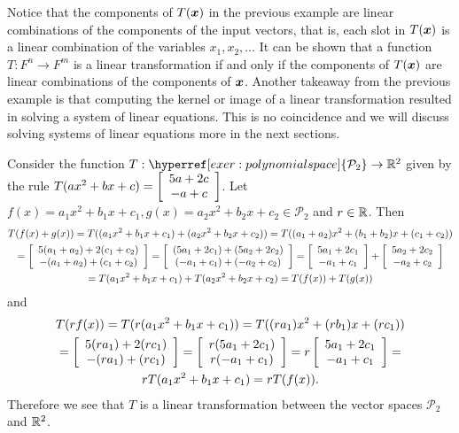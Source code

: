 Notice that the components of $T(\bb x)$ in the previous example are linear combinations of the components of the input vectors, that is, each slot in $T(\bb x)$ is a linear combination of the variables $x_1, x_2, \ldots$  It can be shown that a function $T : F^n \to F^m$ is a linear transformation if and only if the components of $T(\bb x)$ are linear combinations of the components of $\bb x$. Another takeaway from the previous example is that computing the kernel or image of a linear transformation resulted in solving a system of linear equations. This is no coincidence and we will discuss solving systems of linear equations more in the next sections. \\

\begin{Exam} Consider the function $T : \hyperref[exer:polynomial space]{\mathcal{P}_2} \to \R^2$ given by the rule $T(ax^2+bx+c)=\mtx{c}{5a+2c\\-a+c}$.  Let $f(x) = a_1x^2+b_1x+c_1, g(x)=a_2x^2+b_2x+c_2\in \mathcal{P}_2$ and $r\in \R$. Then
\begin{multline*}T(f(x) + g(x)) = T((a_1x^2+b_1x+c_1) + (a_2x^2+b_2x+c_2)) = T((a_1+a_2)x^2+(b_1+b_2)x+(c_1+c_2))\\ = \mtx{c}{5(a_1+a_2) + 2(c_1+c_2)\\ -(a_1+a_2)+(c_1+c_2)} = \mtx{c}{(5a_1+2c_1)+(5a_2+2c_2)\\(-a_1+c_1) + (-a_2+c_2)} = \mtx{c}{5a_1+2c_1\\-a_1+c_1} + \mtx{c}{5a_2+2c_2\\-a_2+c_2}\\ = T(a_1x^2+b_1x+c_1) + T(a_2x^2+b_2x+c_2) = T(f(x)) + T(g(x))\end{multline*}
and
\begin{multline*}T(rf(x)) = T(r(a_1x^2+b_1x+c_1)) = T((ra_1)x^2+(rb_1)x+(rc_1)) \\ =\mtx{c}{5(ra_1)+2(rc_1)\\ -(ra_1)+(rc_1)} = \mtx{c}{r(5a_1+2c_1)\\ r(-a_1+c_1)} = r\mtx{c}{5a_1+2c_1\\ -a_1+c_1} =\\ rT(a_1x^2+b_1x+c_1)=rT(f(x)).\end{multline*} Therefore we see that $T$ is a linear transformation between the vector spaces $\mathcal{P}_2$ and $\R^2$. \\


\end{Exam}
